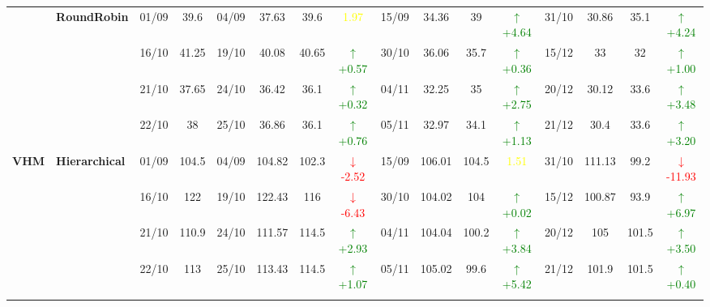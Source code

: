 \documentclass{ieeeaccess}
\begin{document}
{\begin{longtable}{llcc|cccc|cccc|cccc}
& \textbf{RoundRobin}
& 01/09 & 39.6 & 04/09 & 37.63 & 39.6 & \textcolor{yellow}{1.97} & 15/09 & 34.36 & 39 & \textcolor{green}{\(\uparrow\)+4.64} & 31/10 & 30.86 & 35.1 & \textcolor{green}{\(\uparrow\)+4.24} \\

&
& 16/10 & 41.25 & 19/10 & 40.08 & 40.65 & \textcolor{green}{\(\uparrow\)+0.57} & 30/10 & 36.06 & 35.7 & \textcolor{green}{\(\uparrow\)+0.36} & 15/12 & 33 & 32 & \textcolor{green}{\(\uparrow\)+1.00} \\

&
& 21/10 & 37.65 & 24/10 & 36.42 & 36.1 & \textcolor{green}{\(\uparrow\)+0.32} & 04/11 & 32.25 & 35 & \textcolor{green}{\(\uparrow\)+2.75} & 20/12 & 30.12 & 33.6 & \textcolor{green}{\(\uparrow\)+3.48} \\

&
& 22/10 & 38 & 25/10 & 36.86 & 36.1 & \textcolor{green}{\(\uparrow\)+0.76} & 05/11 & 32.97 & 34.1 & \textcolor{green}{\(\uparrow\)+1.13} & 21/12 & 30.4 & 33.6 & \textcolor{green}{\(\uparrow\)+3.20} \\
\midrule




\multirow{12}{*}{\textbf{VHM}} 
& \textbf{Hierarchical}
& 01/09 & 104.5 & 04/09 & 104.82 & 102.3 & \textcolor{red}{\(\downarrow\)-2.52} & 15/09 & 106.01 & 104.5 & \textcolor{yellow}{1.51} & 31/10 & 111.13 & 99.2 & \textcolor{red}{\(\downarrow\)-11.93} \\

&
& 16/10 & 122 & 19/10 & 122.43 & 116 & \textcolor{red}{\(\downarrow\)-6.43} & 30/10 & 104.02 & 104 & \textcolor{green}{\(\uparrow\)+0.02} & 15/12 & 100.87 & 93.9 & \textcolor{green}{\(\uparrow\)+6.97} \\

&
& 21/10 & 110.9 & 24/10 & 111.57 & 114.5 & \textcolor{green}{\(\uparrow\)+2.93} & 04/11 & 104.04 & 100.2 & \textcolor{green}{\(\uparrow\)+3.84} & 20/12 & 105 & 101.5 & \textcolor{green}{\(\uparrow\)+3.50} \\

&
& 22/10 & 113 & 25/10 & 113.43 & 114.5 & \textcolor{green}{\(\uparrow\)+1.07} & 05/11 & 105.02 & 99.6 & \textcolor{green}{\(\uparrow\)+5.42} & 21/12 & 101.9 & 101.5 & \textcolor{green}{\(\uparrow\)+0.40} \\
\cmidrule(lr){2-16}



\end{longtable}}
\end{document}

